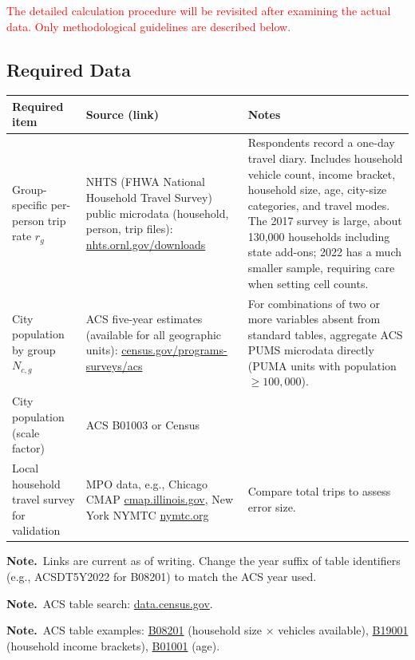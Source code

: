 \documentclass[10pt,a4paper]{article}
\newcommand{\note}{\textbf{Note.}\ }
\begin{document}
\textcolor{red}{The detailed calculation procedure will be revisited after examining the actual data. Only methodological guidelines are described below.}
\subsection{Required Data}
{\footnotesize
\begin{longtable}{@{}L{0.21\textwidth}L{0.37\textwidth}L{0.36\textwidth}@{}}
\toprule Required item & Source (link) & Notes\\\midrule\endhead\bottomrule\endlastfoot
Group-specific per-person trip rate $r_g$ & NHTS (FHWA National Household Travel Survey) public microdata (household, person, trip files): \href{https://nhts.ornl.gov/downloads}{nhts.ornl.gov/downloads} & Respondents record a one-day travel diary. Includes household vehicle count, income bracket, household size, age, city-size categories, and travel modes. The 2017 survey is large, about 130,000 households including state add-ons; 2022 has a much smaller sample, requiring care when setting cell counts.\\
City population by group $N_{c,g}$ & ACS five-year estimates (available for all geographic units): \href{https://www.census.gov/programs-surveys/acs}{census.gov/programs-surveys/acs} & For combinations of two or more variables absent from standard tables, aggregate ACS PUMS microdata directly (PUMA units with population $\ge100{,}000$).\\
City population (scale factor) & ACS B01003 or Census & \\
Local household travel survey for validation & MPO data, e.g., Chicago CMAP \href{https://www.cmap.illinois.gov/}{cmap.illinois.gov}, New York NYMTC \href{https://www.nymtc.org/}{nymtc.org} & Compare total trips to assess error size.\\
\end{longtable}}
\note Links are current as of writing. Change the year suffix of table identifiers (e.g., ACSDT5Y2022 for B08201) to match the ACS year used.

\note ACS table search: \href{https://data.census.gov/}{data.census.gov}.

\note ACS table examples: \href{https://data.census.gov/table/ACSDT5Y2022.B08201}{B08201} (household size $\times$ vehicles available), \href{https://data.census.gov/table/ACSDT5Y2022.B19001}{B19001} (household income brackets), \href{https://data.census.gov/table/ACSDT5Y2022.B01001}{B01001} (age).
\end{document}
